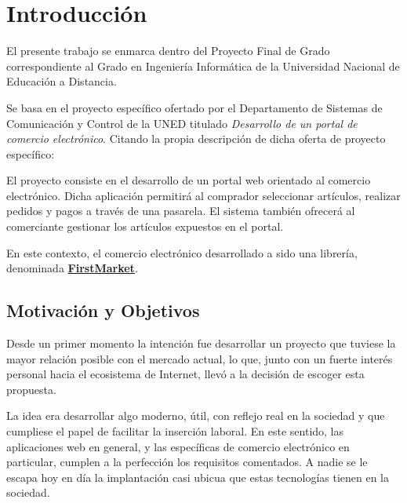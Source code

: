 \documentclass[a4paper,12pt,twoside,openright]{report}
\begin{document}
    \tableofcontents
    
    \listoffigures
    
    \listoftables
    \clearpage
    
    \fancyhf{}
    \pagestyle{fancy}
    \fancyhead[RO]{\nouppercase{\leftmark}}
    \fancyhead[LE]{\thetitle}
    \fancyfoot[LE,RO]{\thepage}

    \chapter{Introducción}
    El presente trabajo se enmarca dentro del Proyecto Final de Grado correspondiente al Grado en Ingeniería Informática de la Universidad Nacional de Educación a Distancia.
    
    Se basa en el proyecto específico ofertado por el Departamento de Sistemas de Comunicación y Control de la UNED titulado \emph{Desarrollo de un portal de comercio electrónico}. Citando la propia descripción de dicha oferta de proyecto específico:
    
    \begin{displayquote}
        El proyecto consiste en el desarrollo de un portal web orientado al comercio electrónico. Dicha aplicación permitirá al comprador seleccionar artículos, realizar pedidos y pagos a través de una pasarela. El sistema también ofrecerá al comerciante gestionar los artículos expuestos en el portal.
    \end{displayquote}

	En este contexto, el comercio electrónico desarrollado a sido una librería, denominada \href{https://firstmarket.tech}{\textbf{FirstMarket}}.

    \section{Motivación y Objetivos}
    Desde un primer momento la intención fue desarrollar un proyecto que tuviese la mayor relación posible con el mercado actual, lo que, junto con un fuerte interés personal hacia el ecosistema de Internet, llevó a la decisión de escoger esta propuesta.
    
    La idea era desarrollar algo moderno, útil, con reflejo real en la sociedad y que cumpliese el papel de facilitar la inserción laboral. En este sentido, las aplicaciones web en general, y las específicas de comercio electrónico en particular, cumplen a la perfección los requisitos comentados. A nadie se le escapa hoy en día la implantación casi ubicua que estas tecnologías tienen en la sociedad.
    
\end{document}
